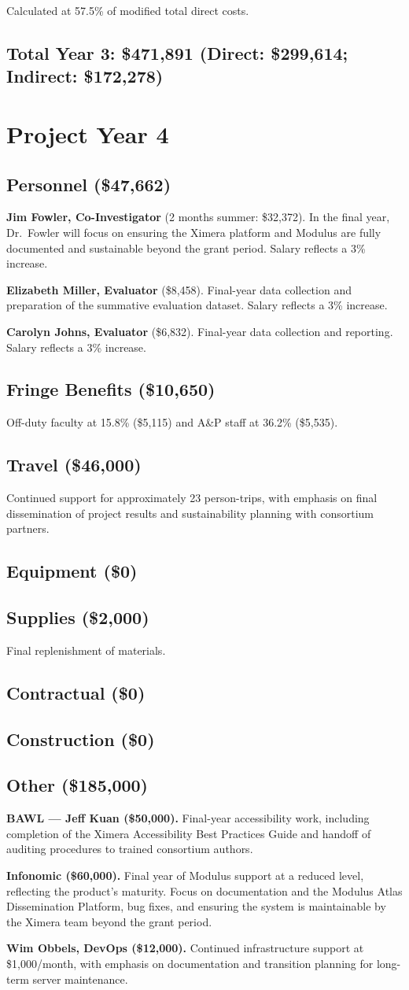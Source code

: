 \documentclass[12pt,letterpaper]{article}
\newcommand{\budgetyear}[1]{\section{Project Year #1}}
\newcommand{\budgetcat}[1]{\subsection*{#1}}
\begin{document}
Calculated at 57.5\% of modified total direct costs.


\budgetcat{Total Year 3: \$471,891 (Direct: \$299,614; Indirect: \$172,278)}

\budgetyear{4}



\budgetcat{Personnel (\$47,662)}

\textbf{Jim Fowler, Co-Investigator} (2 months summer: \$32,372). In the final year, Dr.\ Fowler will focus on ensuring the Ximera platform and Modulus are fully documented and sustainable beyond the grant period. Salary reflects a 3\% increase.

\textbf{Elizabeth Miller, Evaluator} (\$8,458). Final-year data collection and preparation of the summative evaluation dataset. Salary reflects a 3\% increase.

\textbf{Carolyn Johns, Evaluator} (\$6,832). Final-year data collection and reporting. Salary reflects a 3\% increase.

\budgetcat{Fringe Benefits (\$10,650)}

Off-duty faculty at 15.8\% (\$5,115) and A\&P staff at 36.2\% (\$5,535).

\budgetcat{Travel (\$46,000)}

Continued support for approximately 23 person-trips, with emphasis on final dissemination of project results and sustainability planning with consortium partners.

\budgetcat{Equipment (\$0)}

\budgetcat{Supplies (\$2,000)}

Final replenishment of materials.

\budgetcat{Contractual (\$0)}

\budgetcat{Construction (\$0)}

\budgetcat{Other (\$185,000)}

\textbf{BAWL --- Jeff Kuan (\$50,000).} Final-year accessibility work, including completion of the Ximera Accessibility Best Practices Guide and handoff of auditing procedures to trained consortium authors.

\textbf{Infonomic (\$60,000).} Final year of Modulus support at a reduced level, reflecting the product's maturity. Focus on documentation and the Modulus Atlas Dissemination Platform, bug fixes, and ensuring the system is maintainable by the Ximera team beyond the grant period.

\textbf{Wim Obbels, DevOps (\$12,000).} Continued infrastructure support at \$1,000/month, with emphasis on documentation and transition planning for long-term server maintenance.
\end{document}
